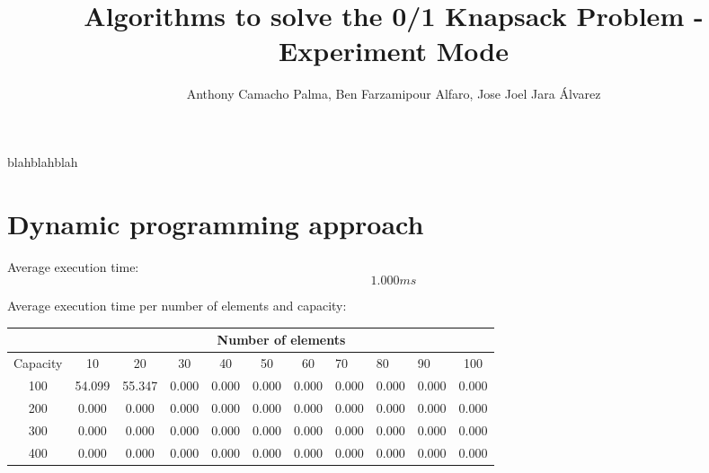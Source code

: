 \documentclass[11pt]{article}
\begin{document}
\title{Algorithms to solve the 0/1 Knapsack Problem - Experiment Mode}
\author{Anthony Camacho Palma, Ben Farzamipour Alfaro, Jose Joel Jara Álvarez}
\maketitle
blahblahblah

\section{Dynamic programming approach}

Average execution time:
\[1.000 ms\]

Average execution time per number of elements and capacity:

\begin{table}[h!]
\centering
\begin{tabular}{c|cccccccccc|}
\cline{2-11}
& \multicolumn{10}{c|}{Number of elements}\\ \hline
\multicolumn{1}{|c|}{Capacity} & \multicolumn{1}{c|}{10} & \multicolumn{1}{c|}{20} & \multicolumn{1}{c|}{30} & \multicolumn{1}{c|}{40} & \multicolumn{1}{c|}{50} & \multicolumn{1}{c|}{60} & \multicolumn{1}{l|}{70} & \multicolumn{1}{l|}{80} & \multicolumn{1}{l|}{90} & 100 \\ \hline
\multicolumn{1}{|c|}{100} & \multicolumn{1}{c|}{54.099} & \multicolumn{1}{c|}{55.347} & \multicolumn{1}{c|}{0.000} & \multicolumn{1}{c|}{0.000} & \multicolumn{1}{c|}{0.000} & \multicolumn{1}{c|}{0.000} & \multicolumn{1}{c|}{0.000} & \multicolumn{1}{c|}{0.000} & \multicolumn{1}{c|}{0.000}  & 0.000 \\ \hline
\multicolumn{1}{|c|}{200} & \multicolumn{1}{c|}{0.000} & \multicolumn{1}{c|}{0.000} & \multicolumn{1}{c|}{0.000} & \multicolumn{1}{c|}{0.000} & \multicolumn{1}{c|}{0.000} & \multicolumn{1}{c|}{0.000} & \multicolumn{1}{c|}{0.000} & \multicolumn{1}{c|}{0.000} & \multicolumn{1}{c|}{0.000}  & 0.000 \\ \hline
\multicolumn{1}{|c|}{300} & \multicolumn{1}{c|}{0.000} & \multicolumn{1}{c|}{0.000} & \multicolumn{1}{c|}{0.000} & \multicolumn{1}{c|}{0.000} & \multicolumn{1}{c|}{0.000} & \multicolumn{1}{c|}{0.000} & \multicolumn{1}{c|}{0.000} & \multicolumn{1}{c|}{0.000} & \multicolumn{1}{c|}{0.000}  & 0.000 \\ \hline
\multicolumn{1}{|c|}{400} & \multicolumn{1}{c|}{0.000} & \multicolumn{1}{c|}{0.000} & \multicolumn{1}{c|}{0.000} & \multicolumn{1}{c|}{0.000} & \multicolumn{1}{c|}{0.000} & \multicolumn{1}{c|}{0.000} & \multicolumn{1}{c|}{0.000} & \multicolumn{1}{c|}{0.000} & \multicolumn{1}{c|}{0.000}  & 0.000 \\ \hline

\end{tabular}
\end{table}
\end{document}
